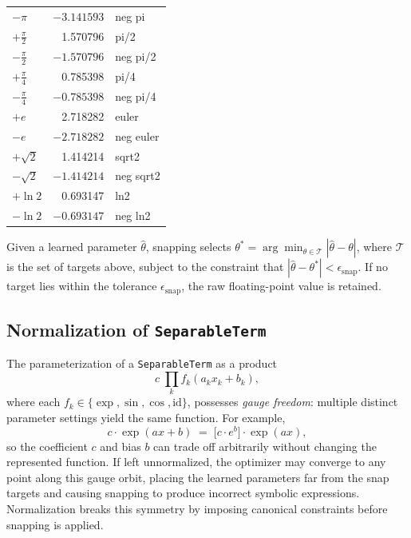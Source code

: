 \begin{table}[h]
\begin{tabular}{lrl}
$-\pi$          & $-3.141593$ & neg pi \\
$+\tfrac{\pi}{2}$ &  1.570796 & pi/2 \\
$-\tfrac{\pi}{2}$ & $-1.570796$ & neg pi/2 \\
$+\tfrac{\pi}{4}$ &  0.785398 & pi/4 \\
$-\tfrac{\pi}{4}$ & $-0.785398$ & neg pi/4 \\
$+e$            &  2.718282 & euler \\
$-e$            & $-2.718282$ & neg euler \\
$+\sqrt{2}$    &  1.414214 & sqrt2 \\
$-\sqrt{2}$    & $-1.414214$ & neg sqrt2 \\
$+\ln 2$       &  0.693147 & ln2 \\
$-\ln 2$       & $-0.693147$ & neg ln2 \\
\bottomrule
\end{tabular}
\end{table}

Given a learned parameter $\hat{\theta}$, snapping selects
$\theta^* = \arg\min_{\theta \in \mathcal{T}} |\hat{\theta} - \theta|$,
where $\mathcal{T}$ is the set of targets above, subject to the
constraint that $|\hat{\theta} - \theta^*| < \epsilon_{\mathrm{snap}}$.
If no target lies within the tolerance $\epsilon_{\mathrm{snap}}$, the
raw floating-point value is retained.

\subsection{Normalization of \texttt{SeparableTerm}}

The parameterization of a \texttt{SeparableTerm} as a product
\begin{equation}
  c \;\prod_k f_k(a_k x_k + b_k),
  \label{eq:separable-form}
\end{equation}
where each $f_k \in \{\exp, \sin, \cos, \mathrm{id}\}$, possesses
\emph{gauge freedom}: multiple distinct parameter settings yield the
same function. For example,
\begin{equation}
  c \cdot \exp(a x + b) \;=\; \bigl[c \cdot e^{b}\bigr] \cdot \exp(a x),
\end{equation}
so the coefficient $c$ and bias $b$ can trade off arbitrarily without
changing the represented function. If left unnormalized, the optimizer
may converge to any point along this gauge orbit, placing the learned
parameters far from the snap targets and causing snapping to produce
incorrect symbolic expressions. Normalization breaks this symmetry by
imposing canonical constraints before snapping is applied.

